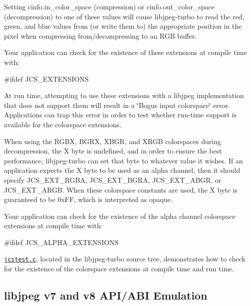 Setting {\ttfamily cinfo.\+in\+\_\+color\+\_\+space} (compression) or {\ttfamily cinfo.\+out\+\_\+color\+\_\+space} (decompression) to one of these values will cause libjpeg-\/turbo to read the red, green, and blue values from (or write them to) the appropriate position in the pixel when compressing from/decompressing to an R\+GB buffer.

Your application can check for the existence of these extensions at compile time with\+: \begin{DoxyVerb}#ifdef JCS_EXTENSIONS
\end{DoxyVerb}


At run time, attempting to use these extensions with a libjpeg implementation that does not support them will result in a \char`\"{}\+Bogus input colorspace\char`\"{} error. Applications can trap this error in order to test whether run-\/time support is available for the colorspace extensions.

When using the R\+G\+BX, B\+G\+RX, X\+B\+GR, and X\+R\+GB colorspaces during decompression, the X byte is undefined, and in order to ensure the best performance, libjpeg-\/turbo can set that byte to whatever value it wishes. If an application expects the X byte to be used as an alpha channel, then it should specify {\ttfamily J\+C\+S\+\_\+\+E\+X\+T\+\_\+\+R\+G\+BA}, {\ttfamily J\+C\+S\+\_\+\+E\+X\+T\+\_\+\+B\+G\+RA}, {\ttfamily J\+C\+S\+\_\+\+E\+X\+T\+\_\+\+A\+B\+GR}, or {\ttfamily J\+C\+S\+\_\+\+E\+X\+T\+\_\+\+A\+R\+GB}. When these colorspace constants are used, the X byte is guaranteed to be 0x\+FF, which is interpreted as opaque.

Your application can check for the existence of the alpha channel colorspace extensions at compile time with\+: \begin{DoxyVerb}#ifdef JCS_ALPHA_EXTENSIONS
\end{DoxyVerb}


\href{jcstest.c}{\tt jcstest.\+c}, located in the libjpeg-\/turbo source tree, demonstrates how to check for the existence of the colorspace extensions at compile time and run time.

\subsection*{libjpeg v7 and v8 A\+P\+I/\+A\+BI Emulation }

